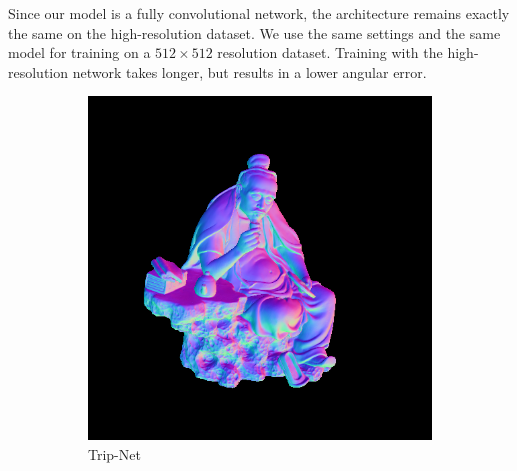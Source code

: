 Since our model is a fully convolutional network, the architecture remains exactly the same on the high-resolution dataset. We use the same settings and the same model for training on a $ 512\times512 $ resolution dataset. Training with the high-resolution network takes longer, but results in a lower angular error. 



\begin{figure}[th]
	\centering
	\captionsetup{width=\linewidth}
	\begin{subfigure}[b]{0.48\linewidth}
		\includegraphics[width=\linewidth]{./Figures/comparison_512/fancy_eval_11_normal_Trip-Net-512.png}
		\caption{Trip-Net}
	\end{subfigure}
	\begin{subfigure}[b]{0.48\linewidth}

\end{subfigure}
\end{figure}

